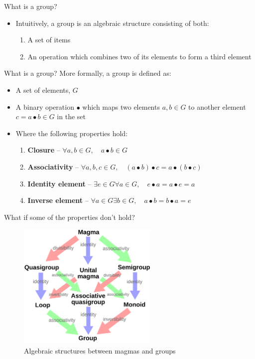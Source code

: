 \documentclass{beamer}
\begin{document}
\begin{frame}{What is a group?}
    \begin{itemize}
        \item Intuitively, a group is an algebraic structure consisting of both:
        \vskip 1cm
        \begin{enumerate}
            \item A set of items
            \item An operation which combines two of its elements to form a third element
        \end{enumerate}
    \end{itemize}
\end{frame}

\begin{frame}{What is a group?}
    More formally, a group is defined as:
    \begin{itemize}
        \item A set of elements, $G$
        \item A binary operation $\bullet$ which maps two elements $a,b \in G$ to another element $c = a \bullet b \in G$ in the set
        \item Where the following properties hold:
        \begin{enumerate}
            \item \textbf{Closure} -- $\forall a,b \in G, \quad a \bullet b \in G$
            \item \textbf{Associativity} -- $\forall a,b,c \in G, \quad (a \bullet b) \bullet c = a \bullet (b \bullet c)$
            \item \textbf{Identity element} -- $\exists e \in G \forall a \in G, \quad e \bullet a = a \bullet e = a$
            \item \textbf{Inverse element} -- $\forall a \in G \exists b \in G, \quad a \bullet b = b \bullet a = e$
        \end{enumerate}
    \end{itemize}
\end{frame}

\begin{frame}{What if some of the properties don't hold?}
    \begin{figure}
        \includegraphics[width=0.6\textwidth]{images/group_theory/algebraic_structures.png}
        \caption{\label{fig:algebraic-structures}Algebraic structures between magmas and groups \cite{ethaniel_english_2020}}
    \end{figure}
\end{frame}
\end{document}
